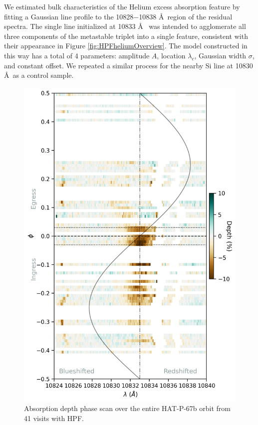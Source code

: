 \documentclass[twocolumn]{aastex631}
\begin{document}
We estimated bulk characteristics of the Helium excess absorption feature by fitting a Gaussian line profile to the 10828$-$10838 \AA~region of the residual spectra.  The single line initialized at 10833 \AA~ was intended to agglomerate all three components of the metastable triplet into a single feature, consistent with their appearance in Figure \ref{fig:HPFheliumOverview}.  The model constructed in this way has a total of 4 parameters: amplitude $A$, location $\lambda_c$, Gaussian width $\sigma$, and constant offset.  We repeated a similar process for the nearby Si line at 10830 \AA~as a control sample.

\begin{figure}
    \includegraphics[width=\linewidth]{figures/phase_2D_diagram_resid.png}
    \caption{Absorption depth phase scan over the entire HAT-P-67b orbit from 41 visits with HPF.  }
    \label{fig:HPFscanResid}
\end{figure}
\end{document}
